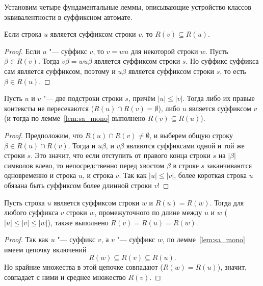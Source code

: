 Установим четыре фундаментальные леммы, описывающие устройство классов эквивалентности в суффиксном автомате.

\begin{lemma}\label{lem:sa_mono}
    Если строка $u$ является суффиксом строки $v$, то $R(v) \subseteq R(u)$.
\end{lemma}

\begin{proof}
    Если $u$ "--- суффикс $v$, то $v = w u$ для некоторой строки $w$. Пусть $\beta \in R(v)$. Тогда $v\beta = w u \beta$ является суффиксом строки $s$. Но суффикс суффикса сам является суффиксом, поэтому и $u\beta$ является суффиксом строки $s$, то есть $\beta \in R(u)$.
\end{proof}

\begin{lemma}\label{lem:sa_nested}
    Пусть $u$ и $v$ "--- две подстроки строки $s$, причём $|u| \le |v|$. Тогда либо их правые контексты не пересекаются ($R(u) \cap R(v) = \emptyset$), либо $u$ является суффиксом $v$ (и тогда по лемме~\ref{lem:sa_mono} выполнено $R(v) \subseteq R(u)$).
\end{lemma}

\begin{proof}
    Предположим, что $R(u) \cap R(v) \ne \emptyset$, и выберем общую строку $\beta \in R(u) \cap R(v)$. Тогда и $u\beta$, и $v\beta$ являются суффиксами одной и той же строки $s$. Это значит, что если отступить от правого конца строки $s$ на $|\beta|$ символов влево, то непосредственно перед хвостом $\beta$ в строке $s$ заканчиваются одновременно и строка $u$, и строка $v$. Так как $|u| \le |v|$, более короткая строка $u$ обязана быть суффиксом более длинной строки $v$!
\end{proof}

\begin{lemma}\label{lem:sa_interval}
    Пусть строка $u$ является суффиксом строки $w$ и $R(u) = R(w)$. Тогда для любого суффикса $v$ строки $w$, промежуточного по длине между $u$ и $w$ ($|u| \le |v| \le |w|$), также выполнено $R(v) = R(u) = R(w)$.
\end{lemma}

\begin{proof}
    Так как $u$ "--- суффикс $v$, а $v$ "--- суффикс $w$, по лемме~\ref{lem:sa_mono} имеем цепочку включений
    \[
        R(w) \subseteq R(v) \subseteq R(u).
    \]
    Но крайние множества в этой цепочке совпадают ($R(w) = R(u)$), значит, совпадает с ними и среднее множество $R(v)$.
\end{proof}

